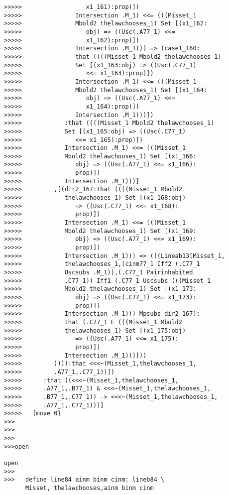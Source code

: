 \documentclass[12pt]{article}
\begin{document}
\begin{verbatim}
>>>>>                  x1_161):prop)])
>>>>>               Intersection .M_1) <<= (((Misset_1
>>>>>               Mbold2 thelawchooses_1) Set [(x1_162:
>>>>>                  obj) => ((Usc(.A77_1) <<=
>>>>>                  x1_162):prop)])
>>>>>               Intersection .M_1))) => (case1_160:
>>>>>               that ((((Misset_1 Mbold2 thelawchooses_1)
>>>>>               Set [(x1_163:obj) => ((Usc(.C77_1)
>>>>>                  <<= x1_163):prop)])
>>>>>               Intersection .M_1) <<= (((Misset_1
>>>>>               Mbold2 thelawchooses_1) Set [(x1_164:
>>>>>                  obj) => ((Usc(.A77_1) <<=
>>>>>                  x1_164):prop)])
>>>>>               Intersection .M_1)))])
>>>>>            :that ((((Misset_1 Mbold2 thelawchooses_1)
>>>>>            Set [(x1_165:obj) => ((Usc(.C77_1)
>>>>>               <<= x1_165):prop)])
>>>>>            Intersection .M_1) <<= (((Misset_1
>>>>>            Mbold2 thelawchooses_1) Set [(x1_166:
>>>>>               obj) => ((Usc(.A77_1) <<= x1_166):
>>>>>               prop)])
>>>>>            Intersection .M_1)))]
>>>>>         ,[(dir2_167:that ((((Misset_1 Mbold2
>>>>>            thelawchooses_1) Set [(x1_168:obj)
>>>>>               => ((Usc(.C77_1) <<= x1_168):
>>>>>               prop)])
>>>>>            Intersection .M_1) <<= (((Misset_1
>>>>>            Mbold2 thelawchooses_1) Set [(x1_169:
>>>>>               obj) => ((Usc(.A77_1) <<= x1_169):
>>>>>               prop)])
>>>>>            Intersection .M_1))) => (((Lineab13(Misset_1,
>>>>>            thelawchooses_1,(cinm77_1 Iff2 (.C77_1
>>>>>            Uscsubs .M_1)),(.C77_1 Pairinhabited
>>>>>            .C77_1)) Iff1 (.C77_1 Uscsubs (((Misset_1
>>>>>            Mbold2 thelawchooses_1) Set [(x1_173:
>>>>>               obj) => ((Usc(.C77_1) <<= x1_173):
>>>>>               prop)])
>>>>>            Intersection .M_1))) Mpsubs dir2_167):
>>>>>            that (.C77_1 E (((Misset_1 Mbold2
>>>>>            thelawchooses_1) Set [(x1_175:obj)
>>>>>               => ((Usc(.A77_1) <<= x1_175):
>>>>>               prop)])
>>>>>            Intersection .M_1)))]))
>>>>>         )))):that <<<~(Misset_1,thelawchooses_1,
>>>>>         .A77_1,.C77_1))])
>>>>>      :that ((<<<~(Misset_1,thelawchooses_1,
>>>>>      .A77_1,.B77_1) & <<<~(Misset_1,thelawchooses_1,
>>>>>      .B77_1,.C77_1)) -> <<<~(Misset_1,thelawchooses_1,
>>>>>      .A77_1,.C77_1)))]
>>>>>   {move 0}
>>>
>>>
>>>
>>>open

open
>>>
>>>   define line84 ainm binm cinm: lineb84 \
      Misset, thelawchooses,ainm binm cinm


\end{verbatim}
\end{document}
